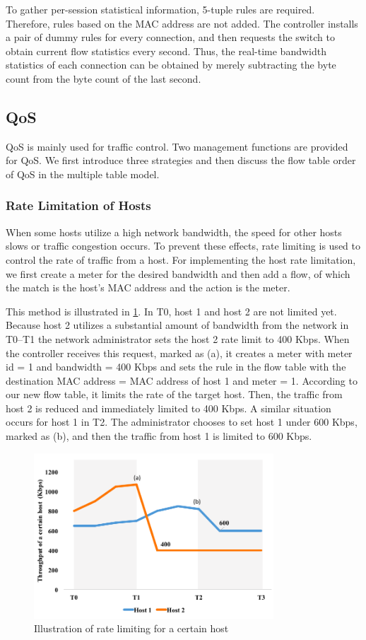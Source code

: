 To gather per-session statistical information, 5-tuple rules are required. Therefore, rules based on the MAC address are not added. The controller installs a pair of dummy rules for every connection, and then requests the switch to obtain current flow statistics every second. Thus, the real-time bandwidth statistics of each connection can be obtained by merely subtracting the byte count from the byte count of the last second.


\subsection{QoS}
QoS is mainly used for traffic control. Two management functions are provided for QoS. We first introduce three strategies and then discuss the flow table order of QoS in the multiple table model.

\subsubsection{Rate Limitation of Hosts}
When some hosts utilize a high network bandwidth, the speed for other hosts slows or traffic congestion occurs. To prevent these effects, rate limiting is used to control the rate of traffic from a host. For implementing the host rate limitation, we first create a meter for the desired bandwidth and then add a flow, of which the match is the host’s MAC address and the action is the meter.

This method is illustrated in \ref{fig:mft_qos_rate_host}. In T0, host 1 and host 2 are not limited yet. Because host 2 utilizes a substantial amount of bandwidth from the network in T0–T1  the network administrator sets the host 2 rate limit to 400 Kbps. When the controller receives this request, marked as (a), it creates a meter with meter id = 1 and bandwidth = 400 Kbps and sets the rule in the flow table with the destination MAC address = MAC address of host 1 and meter = 1. According to our new flow table, it limits the rate of the target host. Then, the traffic from host 2 is reduced and immediately limited to 400 Kbps. A similar situation occurs for host 1 in T2. The administrator chooses to set host 1 under 600 Kbps, marked as (b), and then the traffic from host 1 is limited to 600 Kbps.

\begin{figure}[!t]
\centering
\includegraphics[width=0.8\textwidth]{./fig/mft_qos_rate_host}
\caption{Illustration of rate limiting for a certain host}
\label{fig:mft_qos_rate_host}
\end{figure}


